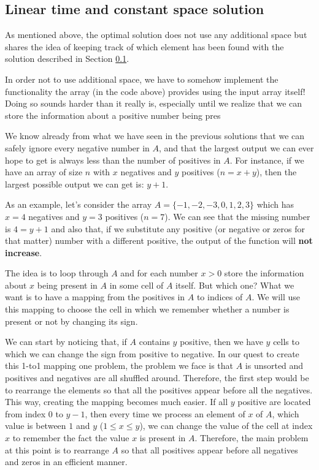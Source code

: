 \subsection{Linear time and constant space solution}
\label{first_positive_missing:sec:linear_space}

As mentioned above, the optimal solution does not use any additional space but shares the idea of keeping track of which
element has been found with the solution described in Section \ref{first_positive_missing:sec:linear_space}. 

In order not to use additional space, we have to somehow implement the functionality the array  (in the code above) provides using the input array itself! Doing so sounds harder than it really is, especially until we realize that we can store the information about a positive number being pres

We know already from what we have seen in the previous solutions that we can safely ignore every negative number in $A$, and that the largest output we can ever hope to get is always less than the number of positives in $A$. For instance, if we have an array of size $n$ with $x$ negatives and $y$ positives ($n=x+y$), then the largest possible output we can get is: $y+1$. 

As an example, let's consider the array $A=\{-1, -2, -3, 0, 1, 2, 3\}$ which has $x=4$ negatives and $y=3$ positives ($n=7$). We can see that the missing number is $4=y+1$ and also that, if we substitute any positive (or negative or zeros for that matter) number with a different positive, the output of the function will \textbf{not increase}. 

The idea is to loop through $A$ and for each number $x>0$ store the information about $x$ being present in $A$ in some cell of $A$ itself. But which one? What we want is to have a mapping from the positives in $A$ to indices of $A$. We will use this mapping to choose the cell in which we remember whether a number is present or not by changing its sign.

We can start by noticing that, if $A$ contains $y$ positive, then we have $y$ cells to which we can change the sign from positive to negative. In our quest to create this 1-to1 mapping one problem, the problem we face is that $A$ is unsorted and positives and negatives are all shuffled around. Therefore, the first step would be to rearrange the elements so that all the positives appear before all the negatives. This way, creating the mapping becomes much easier. If all $y$ positive are located from index $0$ to $y-1$, then every time we process an element of $x$ of $A$, which value is between $1$ and $y$ ($1 \leq x \leq y$), we can change the value of the cell at index $x$ to remember the fact the value $x$ is present in $A$. Therefore, the main problem at this point is to rearrange $A$ so that all positives appear before all negatives and zeros in an efficient manner.


